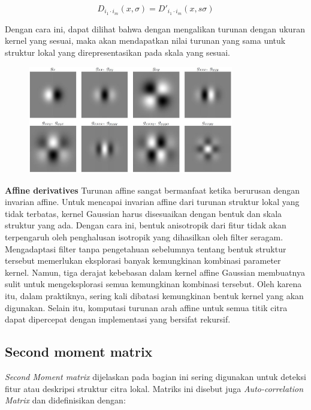 \begin{equation*}
  D_{i_{1}\cdot i_{m}}(x,\sigma) = D'_{i_{1}\cdot i_{m}}(x,s\sigma)
\end{equation*}

Dengan cara ini, dapat dilihat bahwa dengan mengalikan turunan dengan ukuran kernel yang sesuai, 
maka akan mendapatkan nilai turunan yang sama untuk struktur lokal yang direpresentasikan pada skala yang sesuai.

\begin{figure}
  \centering{}
  \includegraphics[width=0.8\textwidth]{gambar/Uniform Gaussian derivatives.jpg}
  \caption{}
\end{figure}

\textbf{Affine derivatives} Turunan affine sangat bermanfaat ketika berurusan dengan invarian affine. 
Untuk mencapai invarian affine dari turunan struktur lokal yang tidak terbatas, 
kernel Gaussian harus disesuaikan dengan bentuk dan skala struktur yang ada. 
Dengan cara ini, bentuk anisotropik dari fitur tidak akan terpengaruh oleh penghalusan isotropik yang dihasilkan oleh filter seragam. 
Mengadaptasi filter tanpa pengetahuan sebelumnya tentang bentuk struktur tersebut memerlukan eksplorasi banyak kemungkinan kombinasi parameter kernel. 
Namun, tiga derajat kebebasan dalam kernel affine Gaussian membuatnya sulit untuk mengeksplorasi semua kemungkinan kombinasi tersebut. 
Oleh karena itu, dalam praktiknya, sering kali dibatasi kemungkinan bentuk kernel yang akan digunakan. 
Selain itu, komputasi turunan arah affine untuk semua titik citra dapat dipercepat dengan implementasi yang bersifat rekursif.

\subsection{Second moment matrix}

\emph{Second Moment matrix} dijelaskan pada bagian ini sering digunakan untuk deteksi 
fitur atau deskripsi struktur citra lokal. Matriks ini disebut juga \emph{Auto-correlation Matrix} 
dan didefinisikan dengan:

